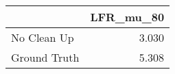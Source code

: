 \begin{tabular}{lr}
\toprule
{} & LFR_mu_80 \\
\midrule
No Clean Up  &     3.030 \\
Ground Truth &     5.308 \\
\bottomrule
\end{tabular}
